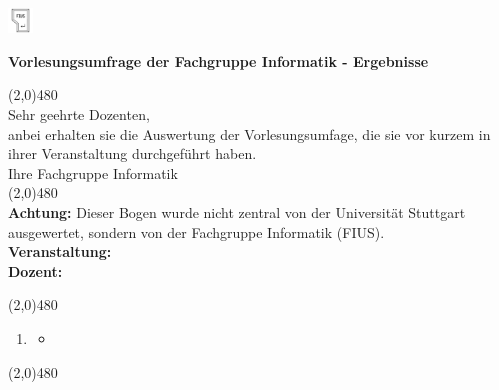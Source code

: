 \documentclass[10pt,a4paper]{article}
\author{Dominik Kesim, Magnus Specht, Sebastian Paule,}
\begin{document}
\begin{floatingfigure}[r]{0.03\textwidth}
\centering
\includegraphics[width=0.05\textwidth]{fius-logo.png}
\end{floatingfigure}
\vspace{-1cm}
\textbf{Vorlesungsumfrage der Fachgruppe Informatik - Ergebnisse}

\vspace{0.3cm}
\line(2,0){480}
\\
Sehr geehrte Dozenten,\\
anbei erhalten sie die Auswertung der Vorlesungsumfage, die sie vor kurzem in ihrer Veranstaltung durchgeführt haben.
\\
Ihre Fachgruppe Informatik\\
\vspace{2pt}
\line(2,0){480}
\vspace{2pt}\\
\textbf{Achtung:} Dieser Bogen wurde nicht zentral von der Universität Stuttgart ausgewertet, sondern von der Fachgruppe Informatik (FIUS).\\

\textbf{Veranstaltung:}\hspace{0.1cm}
\\
\textbf{Dozent:}\hspace{0.2cm}

\vspace{2pt}
\line(2,0){480}
\vspace{2pt}\\

\begin{enumerate}
	\item
	
    \begin{itemize}
    	\setlength\itemsep{1em}
    	\item[]
    \end{itemize}
\end{enumerate}

\vspace{2pt}
\line(2,0){480}
\vspace{2pt}\\
\end{document}

